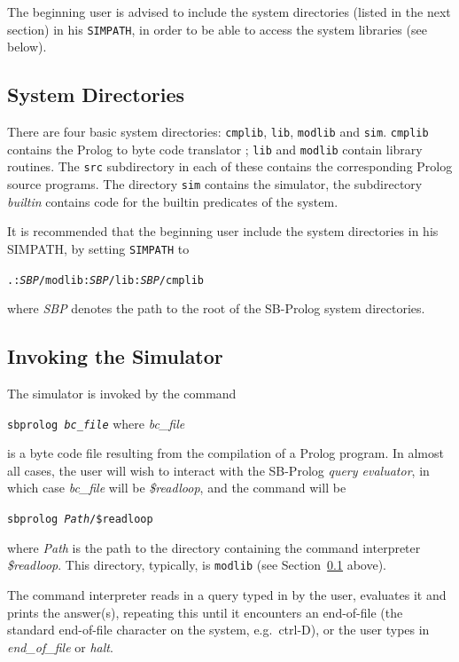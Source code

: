 The beginning user is advised to include the system directories (listed in
the next section) in his {\tt SIMPATH}, in order to be able to access the system
libraries (see below).

\subsection{System Directories} \label{system_directories}
 
There are four basic system directories:
{\tt cmplib}, {\tt lib}, {\tt modlib} and {\tt sim}.
{\tt cmplib} contains the Prolog to byte code translator%
;
{\tt lib} and {\tt modlib} contain library routines.
The {\tt src} subdirectory in each of these contains the corresponding Prolog
source programs.
The directory {\tt sim} contains the simulator,
the subdirectory {\em builtin}
contains code for the builtin predicates of the system.

It is recommended that the beginning user include the system directories in
his SIMPATH, by setting {\tt SIMPATH} to
\begin{center}
{\tt .:{\em SBP}/modlib:{\em SBP}/lib:{\em SBP}/cmplib}
\end{center}
where {\em SBP} denotes the path to the root of the
SB-Prolog system directories.

\subsection{Invoking the Simulator}
 
The simulator is invoked by the command
\begin{center}
{\tt sbprolog {\em bc\_file}} where {\em bc\_file}
\end{center}
is a byte code file
resulting from the compilation of a Prolog program.
In almost all cases, the user will wish to interact with the SB-Prolog
{\em query evaluator},
in which case {\em bc\_file} will be {\em \$readloop}, and the command will be
\begin{center}
{\tt sbprolog {\em Path}/\$readloop}
\end{center}
where {\em Path} is the path to the directory containing the
command interpreter {\em \$readloop}.
This directory, typically, is {\tt modlib}
(see Section~\ref{system_directories} above).

The command interpreter reads in a query typed in by the user, evaluates it and
prints the answer(s), repeating this until it encounters an end-of-file
(the standard end-of-file character on the system, e.g.\ ctrl-D), or the user types
in {\em end\_of\_file} or {\em halt}.

